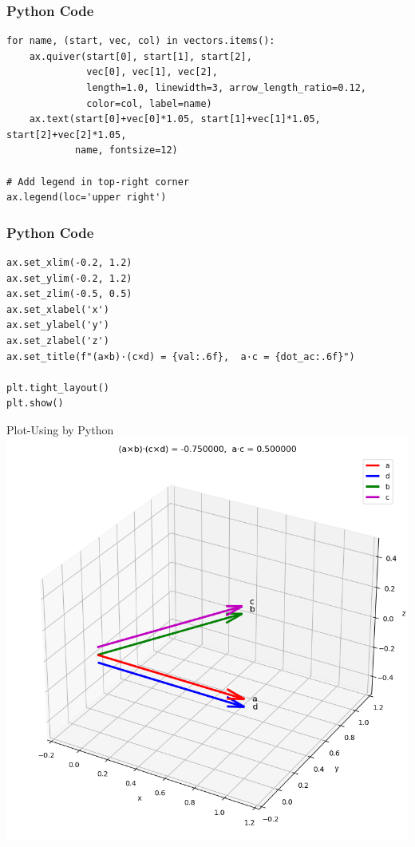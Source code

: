 \documentclass{beamer}
\begin{document}
\begin{frame}[fragile]
    \frametitle{Python Code}
    \begin{lstlisting}
for name, (start, vec, col) in vectors.items():
    ax.quiver(start[0], start[1], start[2],
              vec[0], vec[1], vec[2],
              length=1.0, linewidth=3, arrow_length_ratio=0.12,
              color=col, label=name)
    ax.text(start[0]+vec[0]*1.05, start[1]+vec[1]*1.05, start[2]+vec[2]*1.05,
            name, fontsize=12)

# Add legend in top-right corner
ax.legend(loc='upper right')
\end{lstlisting}
\end{frame}


\begin{frame}[fragile]
    \frametitle{Python Code}
    \begin{lstlisting}
ax.set_xlim(-0.2, 1.2)
ax.set_ylim(-0.2, 1.2)
ax.set_zlim(-0.5, 0.5)
ax.set_xlabel('x')
ax.set_ylabel('y')
ax.set_zlabel('z')
ax.set_title(f"(a×b)·(c×d) = {val:.6f},  a·c = {dot_ac:.6f}")

plt.tight_layout()
plt.show()
\end{lstlisting}
\end{frame}


\begin{frame}{Plot-Using by Python}
    \centering
    \includegraphics[width=\columnwidth, height=0.8\textheight, keepaspectratio]{figs/fig5.png}     
\end{frame}
\end{document}
